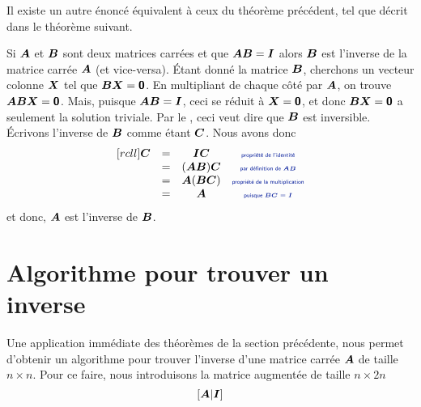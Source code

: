 \begin{theo}
\end{theo}

Il existe un autre énoncé équivalent à ceux du théorème précédent, tel que décrit dans le théorème suivant.

 \begin{theo}\label{inverse}
 Si $\boldsymbol{A}$ et $\boldsymbol{B}$ sont deux matrices carrées et que $\boldsymbol{A}\boldsymbol{B}=\boldsymbol{I}$ alors $\boldsymbol{B}$ est l'inverse de la matrice carrée $\boldsymbol{A}$ (et vice-versa).
 \proof
 Étant donné la matrice $\boldsymbol{B}$, cherchons un vecteur colonne $\boldsymbol{X}$ tel que $\boldsymbol{B}\boldsymbol{X}=\mbox{\textsf{\textbf{{0}}}}$.
 En multipliant de chaque côté par $\boldsymbol{A}$, on trouve $\boldsymbol{A} \boldsymbol{B}\boldsymbol{X}=\mbox{\textsf{\textbf{{0}}}}$.  
 Mais, puisque $\boldsymbol{A}\boldsymbol{B}=\boldsymbol{I}$, ceci se réduit à $\boldsymbol{X}=\mbox{\textsf{\textbf{{0}}}}$, et donc $\boldsymbol{B}\boldsymbol{X}=\mbox{\textsf{\textbf{{0}}}}$ a seulement la solution triviale.  
 Par le , ceci veut dire que $\boldsymbol{B}$ est inversible.  Écrivons l'inverse de $\boldsymbol{B}$ comme étant $\boldsymbol{C}$.
 Nous avons donc
  \[
  \begin{matrix}[rcll]
  \matC &=& \matI\matC  &\explain{propriété de l'identité}\\
   &=& (\matA\matB)\matC &\explain{par définition de $\matA\matB$}\\
   &=& \matA(\matB\matC)&\explain{propriété de la multiplication}\\
   &=& \matA &\explain{puisque $\matB\matC=\matI$}\\
  \end{matrix}
  \]
  et donc, $\boldsymbol{A}$ est l'inverse de $\boldsymbol{B}$.\cqfd
 \end{theo}

 \section{Algorithme pour trouver un inverse}
 
Une application immédiate des théorèmes de la section précédente, nous permet d'obtenir un
algorithme pour trouver l'inverse d'une matrice carrée $\boldsymbol{A}$ de taille $n\times n$.  Pour 
ce faire, nous introduisons la matrice augmentée de taille $n \times 2n$
\[
\left[ \boldsymbol{A} | \boldsymbol{I}\right]
\] 

